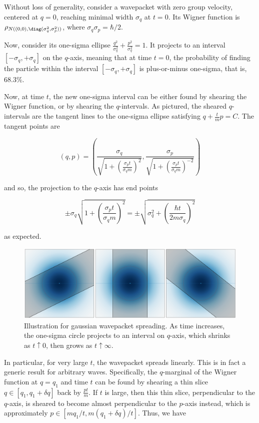 Without loss of generality, consider a wavepacket with zero group
velocity, centered at $q = 0$, reaching minimal width $\sigma_q$ at
$t=0$. Its Wigner function is
$\rho_{N((0, 0), \diag(\sigma_q^2, \sigma_p^2))}$, where
$\sigma_q \sigma_p = \hbar / 2$.

Now, consider its one-sigma ellipse
$\frac{q^2}{\sigma_q^2} + \frac{p^2}{\sigma_q^2} = 1$. It projects to
an interval $[-\sigma_q, +\sigma_q]$ on the $q$-axis, meaning that
at time $t=0$, the probability of finding the particle within the
interval $[-\sigma_q, +\sigma_q]$ is plus-or-minus one-sigma, that is,
68.3\%.

Now, at time $t$, the new one-sigma interval can be either found by
shearing the Wigner function, or by shearing the $q$-intervals. As
pictured, the sheared $q$-intervals are the tangent lines to the
one-sigma ellipse satisfying $q + \frac{t}{m} p = C$. The tangent
points are

$$
(q, p) = \left( \frac{\sigma_q}{\sqrt{1 + \left( \frac{\sigma_p t}{\sigma_q m}\right)^2}}, \frac{\sigma_p}{\sqrt{1 + \left( \frac{\sigma_p t}{\sigma_q m}\right)^{-2}}}\right)
$$

and so, the projection to the $q$-axis has end points

$$
\pm \sigma_q\sqrt{1 + \left( \frac{\sigma_p t}{\sigma_q m}\right)^2} = \pm \sqrt{\sigma_q^2 + \left( \frac{\hbar t}{2m\sigma_q}\right)^2}
$$

as expected.

\begin{figure}
\centering
\includegraphics{figure/gaussian_wavepacket_spreading.png}
\caption{Illustration for gaussian wavepacket spreading. As time
increases, the one-sigma circle projects to an interval on $q$-axis,
which shrinks as $t \uparrow 0$, then grows as $t \uparrow \infty$.}
\end{figure}

In particular, for very large $t$, the wavepacket spreads linearly.
This is in fact a generic result for arbitrary waves. Specifically, the
$q$-marginal of the Wigner function at $q = q_1$ and time $t$ can
be found by shearing a thin slice $q \in [q_1, q_1 + \delta q]$ back
by $\frac{pt}{m}$. If $t$ is large, then this thin slice,
perpendicular to the $q$-axis, is sheared to become almost
perpendicular to the $p$-axis instead, which is approximately
$p \in [mq_1 / t, m(q_1 + \delta q)/ t]$. Thus, we have

